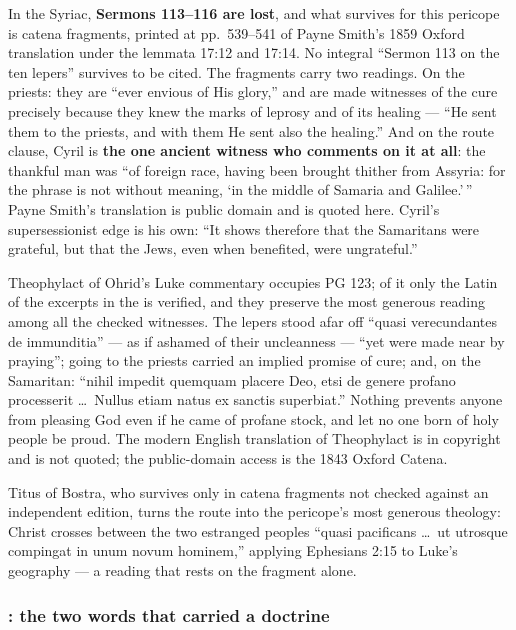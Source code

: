 \begin{witnessnote}
In the Syriac, \textbf{Sermons 113--116 are lost}, and what survives for this
pericope is catena fragments, printed at pp.~539--541 of Payne Smith's 1859
Oxford translation under the lemmata 17:12 and 17:14. No integral ``Sermon 113
on the ten lepers'' survives to be cited. The fragments carry two readings. On the priests: they are ``ever
envious of His glory,'' and are made witnesses of the cure precisely because
they knew the marks of leprosy and of its healing --- ``He sent them to the
priests, and with them He sent also the healing.'' And on the route clause,
Cyril is \textbf{the one ancient witness who comments on it at all}: the
thankful man was ``of foreign race, having been brought thither from Assyria:
for the phrase is not without meaning, `in the middle of Samaria and
Galilee.'\,'' Payne Smith's translation is public domain and is quoted here.
Cyril's supersessionist edge is his own: ``It shows
therefore that the Samaritans were grateful, but that the Jews, even when
benefited, were ungrateful.''
\end{witnessnote}

Theophylact of Ohrid's Luke commentary occupies PG 123; of it only the Latin
of the excerpts in the  is verified, and they preserve the
most generous reading among all the checked witnesses. The lepers stood
afar off ``quasi verecundantes de immunditia'' --- as if ashamed of their
uncleanness --- ``yet were made near by praying''; going to the priests
carried an implied promise of cure; and, on the Samaritan: ``nihil impedit
quemquam placere Deo, etsi de genere profano processerit \dots\ Nullus etiam
natus ex sanctis superbiat.'' Nothing prevents anyone from pleasing God even
if he came of profane stock, and let no one born of holy people be proud.
The modern English translation of Theophylact is in copyright and is not
quoted; the public-domain access is the 1843 Oxford Catena.

Titus of Bostra, who survives only in catena fragments not checked against an
independent edition, turns the route into the pericope's most generous
theology: Christ crosses between the two estranged peoples ``quasi pacificans
\dots\ ut utrosque compingat in unum novum hominem,'' applying Ephesians 2:15
to Luke's geography --- a reading that rests on the fragment alone.

\subsubsection*{: the two words that carried a doctrine}

